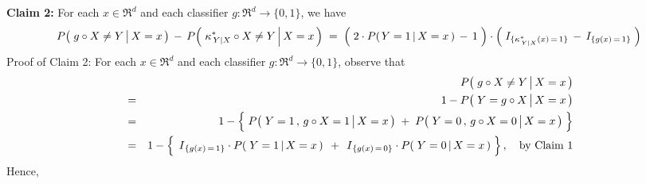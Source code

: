 \vskip 0.8cm
\noindent
\textbf{Claim 2:}\; For each $x \in \Re^{d}$ and each classifier $g : \Re^{d} \longrightarrow \{0,1\}$, we have
\begin{equation*}
P\!\left(\,\left. g \overset{{\color{white}.}}{\circ} X \neq Y \,\right\vert X = x \,\right)
\, - \,
P\!\left(\,\left. \kappa^{*}_{\,Y \vert X} \overset{{\color{white}.}}{\circ} X \neq Y \,\right\vert X = x \,\right)
\; = \;
	\left(\; 2 \cdot P\!\left(\left.Y=1\,\right\vert X =x \,\right) \,\overset{{\color{white}.}}{-}\, 1 \;\right)
	\cdot
	\left(\; I_{\{\kappa^{*}_{\,Y \vert X}(x)\,=\,1\}} \,\overset{{\color{white}.}}{-}\, I_{\{g(x)\,=\,1\}} \;\right)
\end{equation*}
Proof of Claim 2:\; For each $x \in \Re^{d}$ and each classifier $g : \Re^{d} \longrightarrow \{0,1\}$, observe that
\begin{eqnarray*}
&&
	P\!\left(\,\left. \overset{{\color{white}.}}{g} \circ X \neq Y \,\right\vert X = x \,\right)
\\
&=&
	1 - P\!\left(\,\left. Y = \overset{{\color{white}.}}{g} \circ X \,\right\vert X = x \,\right)
\\
&=&
	1 - \left\{\;
		\overset{{\color{white}.}}{P}\!\left(\,\left. Y = 1 \,,\, \overset{{\color{white}.}}{g} \circ X = 1 \,\right\vert X = x \,\right)
		\; + \;
		P\!\left(\,\left. Y = 0 \,,\, \overset{{\color{white}.}}{g} \circ X = 0 \,\right\vert X = x \,\right)
		\;\right\}
\\
&=&
	1 - \left\{\;
		\,\overset{{\color{white}.}}{I}_{\{g(x)\,=\,1\}} \cdot P\!\left(\,\left. Y = 1 \,\right\vert X = x \,\right)\,
		\; + \;
		\,\overset{{\color{white}.}}{I}_{\{g(x)\,=\,0\}} \cdot P\!\left(\,\left. Y = 0 \,\right\vert X = x \,\right)
		\;\right\},
	\quad
	\textnormal{by Claim 1}
\end{eqnarray*}
Hence,
